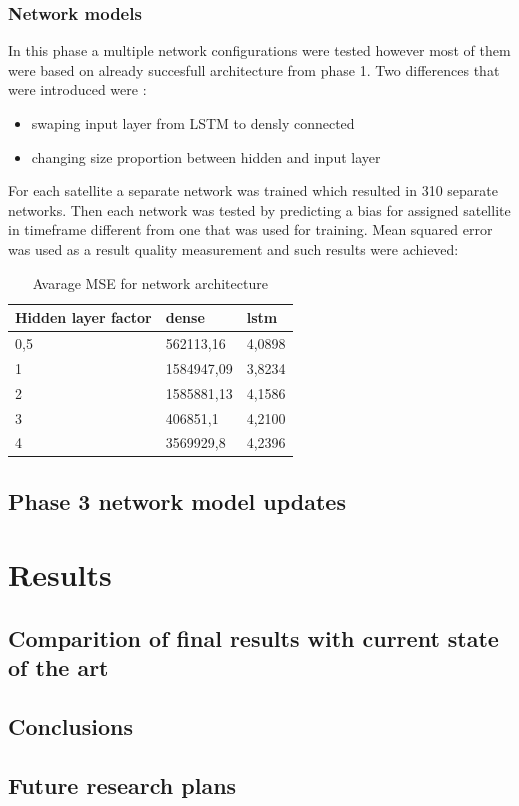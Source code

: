 \subsubsection{Network models}
In this phase a multiple network configurations were tested however most of them were based
on already succesfull architecture from phase 1.
Two differences that were introduced were :
\begin{itemize}
	\item swaping input layer from LSTM to densly connected
	\item changing size proportion between hidden and input layer
\end{itemize}
For each satellite a separate network was trained which resulted in 310 separate networks.
Then each network was tested by predicting a bias for assigned satellite in timeframe different
from one that was used for training. Mean squared error was used as a result quality measurement
and such results were achieved:
\begin{table}[ht] 
	\centering
	\caption{Avarage MSE for network architecture}
	\label{tab:sats_phase_1}
	\begin{tabular}{lll}
		\hline
		\hline
		Hidden layer factor& dense & lstm  \\
		\hline
		0,5& 562113,16& 4,0898\\
		1& 1584947,09& 3,8234\\
		2& 1585881,13& 4,1586\\
		3& 406851,1& 4,2100\\
		4& 3569929,8& 4,2396\\
		\hline
		\hline
	\end{tabular}
\end{table}
\subsection{Phase 3 network model updates}


\section{Results}

\subsection{Comparition of final results with current state of the art}

\subsection{Conclusions}

\subsection{Future research plans}






